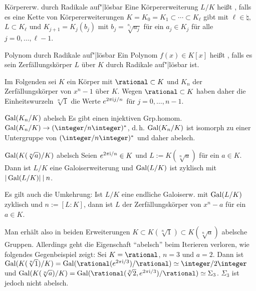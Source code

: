 \begin{Def}{Körpererw. durch Radikale auf"|lösbar}
    Eine Körpererweiterung $L/K$ heißt
    , falls
    es eine Kette von Körpererweiterungen
    $K = K_0 = K_1 \subset \dotsb \subset K_\ell$ gibt mit
    $\ell \in \natural$, $L \subset K_\ell$ und
    $K_{j+1} = K_j(b_j)$ mit $b_j = \sqrt[n_j]{a_j}$ für ein $a_j \in K_j$
    für alle $j = 0, \dotsc, \ell - 1$.
\end{Def}

\begin{Def}{Polynom durch Radikale auf"|lösbar}
    Ein Polynom $f(x) \in K[x]$ heißt
    , falls
    es sein Zerfällungskörper $L$ über $K$ durch Radikale auf"|lösbar ist.
\end{Def}

\linie

\begin{Bem}
    Im Folgenden sei $K$ ein Körper mit $\rational \subset K$
    und $K_n$ der Zerfällungskörper von $x^n - 1$ über $K$.
    Wegen $\rational \subset K$ haben daher die Einheitswurzeln
    $\sqrt[n]{1}$ die Werte $e^{2\pi\text{i} j/n}$ für $j = 0, \dotsc, n - 1$.
\end{Bem}

\begin{Lemma}{$\operatorname{Gal}(K_n/K)$ abelsch}
    Es gibt einen injektiven Grp.homom.
    $\Gal(K_n/K) \rightarrow (\integer/n\integer)^\ast$,
    d.\,h. $\operatorname{Gal}(K_n/K)$ ist isomorph zu einer Untergruppe von
    $(\integer/n\integer)^\ast$ und daher abelsch.
\end{Lemma}

\begin{Lemma}{$\operatorname{Gal}(K(\sqrt[n]{a})/K)$ abelsch}
    Seien $e^{2\pi\text{i}/n} \in K$ und $L := K(\sqrt[n]{a})$ für ein $a \in K$.\\
    Dann ist $L/K$ eine Galoiserweiterung und $\operatorname{Gal}(L/K)$ ist zyklisch mit
    $|\operatorname{Gal}(L/K)| \mathbin{|} n$.
\end{Lemma}

\begin{Bem}
    Es gilt auch die Umkehrung:
    Ist $L/K$ eine endliche Galoiserw. mit $\operatorname{Gal}(L/K)$ zyklisch und
    $n := [L:K]$, dann ist $L$ der Zerfällungskörper von $x^n - a$ für ein
    $a \in K$.
\end{Bem}

\linie
\pagebreak

\begin{Bem}
    Man erhält also in beiden Erweiterungen
    $K \subset K(\sqrt[n]{1}) \subset K(\sqrt[n]{a})$ abelsche Gruppen.
    Allerdings geht die Eigenschaft "`abelsch"' beim Iterieren verloren,
    wie folgendes Gegenbeispiel zeigt:
    Sei $K = \rational$, $n = 3$ und $a = 2$.
    Dann ist $\Gal(K(\sqrt[n]{1})/K) =
    \Gal(\rational(e^{2\pi\i/3})/\rational) \simeq \integer/2\integer$ und
    $\Gal(K(\sqrt[n]{a})/K) =
    \Gal(\rational(\sqrt[3]{2}, e^{2\pi\i/3})/\rational) \simeq \Sigma_3$.
    $\Sigma_3$ ist jedoch nicht abelsch.
\end{Bem}

